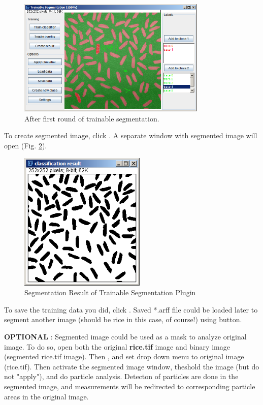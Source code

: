 \begin{indentexercise}{1}
\begin{figure}[htbp]
\begin{center}
\includegraphics[width=9cm]{img/CMCIBasicCourse201102-img123.png}
\caption{ After first round of trainable segmentation.}
\label{fig:img123}
\end{center}
\end{figure}

To create segmented image, click . 
A separate window with segmented image will open (Fig. \ref{fig:img124}). 

\begin{figure}[htbp]
\begin{center}
\includegraphics[width=6cm]{img/CMCIBasicCourse201102-img124.png}
\caption{ Segmentation Result of Trainable Segmentation Plugin}
\label{fig:img124}
\end{center}
\end{figure}

To save the training data you did, click . 
Saved *.arff file could be loaded later to segment another image 
(should be rice in this case, of course!) using  button.

\textbf{OPTIONAL} : Segmented image could be used as a mask to analyze original image. 
To do so, open both the original \textbf{rice.tif} image and binary image (segmented rice.tif image).
Then , and set  drop down menu to
original image (rice.tif). Then activate the segmented image window, theshold the image (but do not
"apply"), and do particle analysis. 
Detecton of particles are done in the segmented image, and
measurements will be redirected to corresponding particle areas in the
original image.  
\end{indentexercise}

